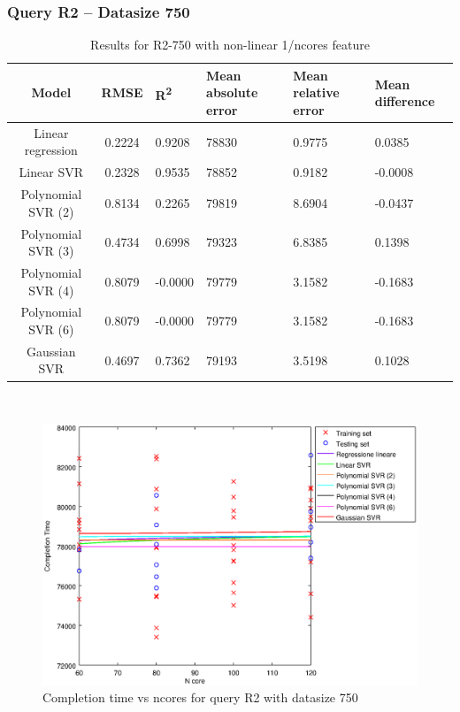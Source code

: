 \documentclass[a4paper,11pt]{article}
\begin{document}
\newpage
\subsubsection{Query R2 -- Datasize 750}
\begin{table}[H]
	\centering
	\begin{adjustbox}{center}
		\begin{tabular}{c | c M{1.2cm} M{2.5cm} M{2.5cm} M{1.8cm}}
			Model & RMSE & R\textsuperscript{2} & Mean absolute error & Mean relative error & Mean difference \tabularnewline
			\hline
			Linear regression & 0.2224 & 0.9208 &  78830 & 0.9775 & 0.0385 \\
			Linear SVR & 0.2328 & 0.9535 &  78852 & 0.9182 & -0.0008 \\
			Polynomial SVR (2) & 0.8134 & 0.2265 &  79819 & 8.6904 & -0.0437 \\
			Polynomial SVR (3) & 0.4734 & 0.6998 &  79323 & 6.8385 & 0.1398 \\
			Polynomial SVR (4) & 0.8079 & -0.0000 &  79779 & 3.1582 & -0.1683 \\
			Polynomial SVR (6) & 0.8079 & -0.0000 &  79779 & 3.1582 & -0.1683 \\
			Gaussian SVR & 0.4697 & 0.7362 &  79193 & 3.5198 & 0.1028 \\
		\end{tabular}
	\end{adjustbox}
	\\
	\caption{Results for R2-750 with non-linear 1/ncores feature}
	\label{table_R2_prediction_all}
\end{table}

\begin {figure}[hbtp]
\centering
\includegraphics[width=\textwidth]{output/R2_750_1_OVER_NCORES/plot_R2_750.eps}
\caption {Completion time vs ncores for query R2 with datasize 750}
\end {figure}
\end{document}
